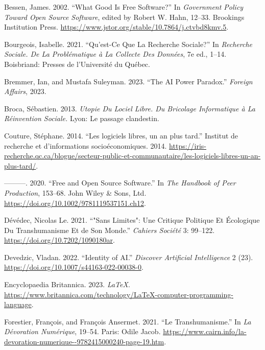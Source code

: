 \documentclass[
  letterpaper,
]{scrbook}
\newlength{\cslhangindent}
\newlength{\cslentryspacingunit} %
\newenvironment{CSLReferences}[2] %
 {%
  \setlength{\parindent}{0pt}
  \ifodd #1
  \let\oldpar\par
  \def\par{\hangindent=\cslhangindent\oldpar}
  \fi
  \setlength{\parskip}{#2\cslentryspacingunit}
 }%
 {}
\begin{document}
\begin{CSLReferences}{1}{0}
\leavevmode{}%
Bessen, James. 2002. {``What {Good Is Free Software}?''} In
\emph{Government {Policy} Toward {Open Source Software}}, edited by
Robert W. Hahn, 12--33. {Brookings Institution Press}.
\url{https://www.jstor.org/stable/10.7864/j.ctvbd8kmv.5}.

\leavevmode{}%
Bourgeois, Isabelle. 2021. {``Qu'est-Ce Que La Recherche Sociale?''} In
\emph{Recherche Sociale. {De} La Problématique à La Collecte Des
Données}, 7e ed., 1--14. {Boisbriand}: {Presses de l'Université du
Québec}.

\leavevmode{}%
Bremmer, Ian, and Mustafa Suleyman. 2023. {``The {AI Power Paradox}.''}
\emph{Foreign Affairs}, 2023.

\leavevmode{}%
Broca, Sébastien. 2013. \emph{Utopie Du Lociel Libre. {Du} Bricolage
Informatique à La Réinvention Sociale.} {Lyon}: {Le passage clandestin}.

\leavevmode{}%
Couture, Stéphane. 2014. {``Les logiciels libres, un an plus tard.''}
{Institut de recherche et d'informations socioéconomiques}. 2014.
\url{https://iris-recherche.qc.ca/blogue/secteur-public-et-communautaire/les-logiciels-libres-un-an-plus-tard/}.

\leavevmode{}%
---------. 2020. {``Free and {Open Source Software}.''} In \emph{The
{Handbook} of {Peer Production}}, 153--68. {John Wiley \& Sons, Ltd}.
\url{https://doi.org/10.1002/9781119537151.ch12}.

\leavevmode{}%
Dévédec, Nicolas Le. 2021. {``"{Sans} Limites": Une Critique Politique
Et Écologique Du Transhumanisme Et de Son Monde.''} \emph{Cahiers
Société} 3: 99--122. \url{https://doi.org/10.7202/1090180ar}.

\leavevmode{}%
Devedzic, Vladan. 2022. {``Identity of {AI}.''} \emph{Discover
Artificial Intelligence} 2 (23).
\url{https://doi.org/10.1007/s44163-022-00038-0}.

\leavevmode{}%
Encyclopaedia Britannica. 2023. \emph{{LaTeX}}.
\url{https://www.britannica.com/technology/LaTeX-computer-programming-language}.

\leavevmode{}%
Forestier, François, and François Ansermet. 2021. {``Le
Transhumanisme.''} In \emph{La {Dévoration Numérique}}, 19--54. {Paris}:
{Odile Jacob}.
\url{https://www.cairn.info/la-devoration-numerique--9782415000240-page-19.htm}.


\end{CSLReferences}
\end{document}
